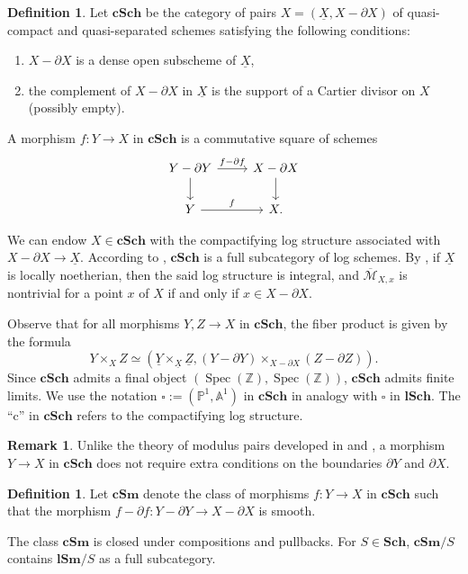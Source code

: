 \documentclass[11pt, a4paper]{amsart}
\theoremstyle{definition}
\newtheorem{df}[thm]{Definition}
\newtheorem{rmk}[thm]{Remark}
\numberwithin{equation}{subsection}
\newcommand{\Z}{\mathbb{Z}}
\renewcommand{\P}{\mathbb{P}}
\newcommand{\A}{\mathbb{A}}
\newcommand{\Sch}{\mathbf{Sch}}
\newcommand{\lSch}{\mathbf{lSch}}
\newcommand{\lSm}{\mathbf{lSm}}
\newcommand{\cSm}{\mathbf{cSm}}
\newcommand{\cSch}{\mathbf{cSch}}
\providecommand{\Spec}[1]{\operatorname{Spec}(#1)} 	%
\newcommand{\ol}{\overline}
\renewcommand{\ul}{\underline}
\newcommand{\cM}{\mathcal{M}}
\newcommand{\boxx}{\square}
\begin{document}
\begin{df}
Let $\cSch$ be the category of pairs $X=(\ul{X},X-\partial X)$ of quasi-compact and quasi-separated
schemes
satisfying the following conditions:
\begin{enumerate}
\item[(i)] $X-\partial X$ is a dense open subscheme of $\ul{X}$,
\item[(ii)] the complement of $X-\partial X$ in $\ul{X}$ is the support of a Cartier divisor on $X$ (possibly empty).
\end{enumerate}
A morphism $f\colon Y\to X$ in $\cSch$ is a commutative square of schemes
\[
\begin{tikzcd}
Y-\partial Y\ar[d]\ar[r,"f-\partial f"]&
X-\partial X\ar[d]
\\
Y\ar[r,"f"]&
X.
\end{tikzcd}
\]

We can endow $X\in \cSch$ with the compactifying log structure associated with $X-\partial X\to \ul{X}$.
According to \cite[Proposition III.1.6.2]{Ogu},
$\cSch$ is a full subcategory of log schemes.
By \cite[Proposition III.1.6.3]{Ogu},
if $\ul{X}$ is locally noetherian,
then the said log structure is integral,
and $\ol{\cM}_{X,x}$ is nontrivial for a point $x$ of $X$ if and only if $x\in X-\partial X$.

Observe that for all morphisms $Y,Z\to X$ in $\cSch$,
the fiber product is given by the formula
\[
Y\times_X Z
\simeq
(
\ul{Y}\times_{\ul{X}}\ul{Z},
(Y-\partial Y)\times_{X-\partial X}(Z-\partial Z)
).
\]
Since $\cSch$ admits a final object $(\Spec{\Z},\Spec{\Z})$,
$\cSch$ admits finite limits.
We use the notation $\boxx:=(\P^1,\A^1)$ in $\cSch$ in analogy with $\boxx$ in $\lSch$.
The “c” in $\cSch$ refers to the compactifying log structure.
\end{df}

\begin{rmk}
Unlike the theory of modulus pairs developed in \cite{zbMATH07341096} and \cite{2106.12837},
a morphism $Y\to X$ in $\cSch$ does not require extra conditions on the boundaries $\partial Y$ and $\partial X$.
\end{rmk}

\begin{df}
Let $\cSm$ denote the class of morphisms $f\colon Y\to X$ in $\cSch$ such that the morphism $f-\partial f\colon Y-\partial Y\to X-\partial X$ is smooth.

The class $\cSm$ is closed under compositions and pullbacks.
For $S\in \Sch$,
$\cSm/S$ contains $\lSm/S$ as a full subcategory.
\end{df}
\end{document}
